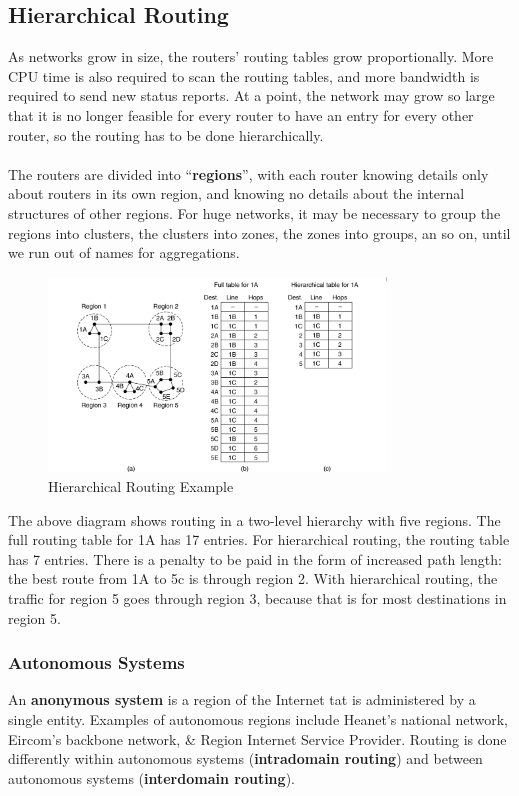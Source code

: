 \documentclass[a4paper,11pt]{article}
\begin{document}
\subsection{Hierarchical Routing}
As networks grow in size, the routers' routing tables grow proportionally. 
More CPU time is also required to scan the routing tables, and more bandwidth is required to send new status reports.
At a point, the network may grow so large that it is no longer feasible for every router to have an entry for every
other router, so the routing has to be done hierarchically.
\\\\
The routers are divided into ``\textbf{regions}'', with each router knowing details only about routers in its own region, 
and knowing no details about the internal structures of other regions.
For huge networks, it may be necessary to group the regions into clusters, the clusters into zones, the zones into groups,
an so on, until we run out of names for aggregations.

\begin{figure}[H]
    \centering
    \includegraphics[width=0.8\textwidth]{./images/hierarchical_routing.png}
    \caption{Hierarchical Routing Example}
\end{figure}
 
The above diagram shows routing in a two-level hierarchy with five regions.
The full routing table for 1A has 17 entries.
For hierarchical routing, the routing table has 7 entries.
There is a penalty to be paid in the form of increased path length: the best route from 1A to 5c is through region 2. 
With hierarchical routing, the traffic for region 5 goes through region 3, because that is for most destinations in 
region 5.

\subsubsection{Autonomous Systems}
An \textbf{anonymous system} is a region of the Internet tat is administered by a single entity. 
Examples of autonomous regions include Heanet's national network, Eircom's backbone network, \& Region Internet Service 
Provider.
Routing is done differently within autonomous systems (\textbf{intradomain routing}) and between autonomous systems 
(\textbf{interdomain routing}).
\end{document}
